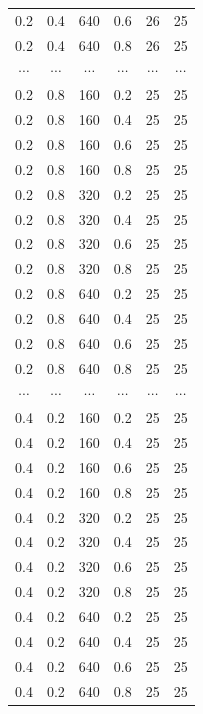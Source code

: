 \documentclass[a4paper,14pt]{article} %
\begin{document}
\begin{table}[H]
\begin{tabular}{|c|c|c|c|c|c|}
0.2&0.4&640&0.6&26&25\\
0.2&0.4&640&0.8&26&25\\
$\cdots$&$\cdots$&$\cdots$&$\cdots$&$\cdots$&$\cdots$\\
0.2&0.8&160&0.2&25&25\\
0.2&0.8&160&0.4&25&25\\
0.2&0.8&160&0.6&25&25\\
0.2&0.8&160&0.8&25&25\\
0.2&0.8&320&0.2&25&25\\
0.2&0.8&320&0.4&25&25\\
0.2&0.8&320&0.6&25&25\\
0.2&0.8&320&0.8&25&25\\
0.2&0.8&640&0.2&25&25\\
0.2&0.8&640&0.4&25&25\\
0.2&0.8&640&0.6&25&25\\
0.2&0.8&640&0.8&25&25\\
$\cdots$&$\cdots$&$\cdots$&$\cdots$&$\cdots$&$\cdots$\\
0.4&0.2&160&0.2&25&25\\
0.4&0.2&160&0.4&25&25\\
0.4&0.2&160&0.6&25&25\\
0.4&0.2&160&0.8&25&25\\
0.4&0.2&320&0.2&25&25\\
0.4&0.2&320&0.4&25&25\\
0.4&0.2&320&0.6&25&25\\
0.4&0.2&320&0.8&25&25\\
0.4&0.2&640&0.2&25&25\\
0.4&0.2&640&0.4&25&25\\
0.4&0.2&640&0.6&25&25\\
0.4&0.2&640&0.8&25&25\\
\hline
\end{tabular}
\end{table}
\end{document}
